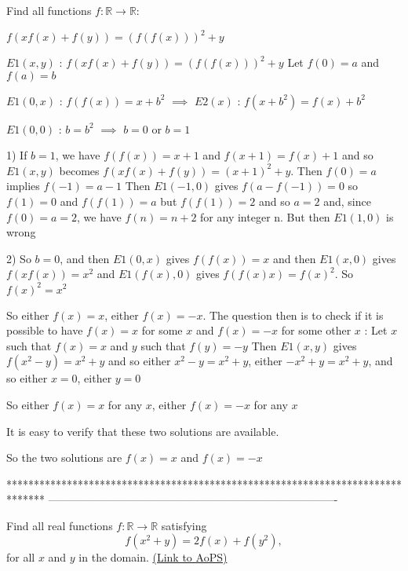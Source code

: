 \begin{mysolution}
	\begin{tcolorbox}Find all functions $f: \mathbb{R}\rightarrow\mathbb{R}$:

$f\left(xf(x)+f(y)\right)=\left(f(f(x))\right)^{2}+y$\end{tcolorbox}

$E1(x,y)$ : $f\left(xf(x)+f(y)\right)=\left(f(f(x))\right)^{2}+y$
Let $f(0)=a$ and $f(a)=b$

$E1(0,x)$ : $f(f(x))=x+b^{2}$ $\implies$ $E2(x)$ : $f(x+b^{2})=f(x)+b^{2}$

$E1(0,0)$ : $b=b^{2}$ $\implies$ $b=0$ or $b=1$

1) If $b=1$, we have $f(f(x))=x+1$ and $f(x+1)=f(x)+1$ and so $E1(x,y)$ becomes $f(xf(x)+f(y))=(x+1)^{2}+y$. 
Then $f(0)=a$ implies $f(-1)=a-1$
Then $E1(-1,0)$ gives $f(a-f(-1))=0$ so $f(1)=0$ and $f(f(1))=a$ but $f(f(1))=2$ and so $a=2$ and, since $f(0)=a=2$, we have $f(n)=n+2$ for any integer n.
But then $E1(1,0)$ is wrong

2) So $b=0$, and then  $E1(0,x)$ gives $f(f(x))=x$ and then $E1(x,0)$ gives $f(xf(x))=x^{2}$ and $E1(f(x),0)$ gives $f(f(x)x)=f(x)^{2}$. So $f(x)^{2}=x^{2}$

So either $f(x)=x$, either $f(x)=-x$. The question then is to check if it is possible to have $f(x)=x$ for some $x$ and $f(x)=-x$ for some other $x$ :
Let $x$ such that $f(x)=x$ and $y$ such that $f(y)=-y$
Then $E1(x,y)$ gives $f(x^{2}-y)=x^{2}+y$ and so either $x^{2}-y=x^{2}+y$, either $-x^{2}+y=x^{2}+y$, and so either $x=0$, either $y=0$

So either $f(x)=x$ for any $x$, either $f(x)=-x$ for any $x$

It is easy to verify that these two solutions are available.

So the two solutions are $f(x)=x$ and $f(x)=-x$
\end{mysolution}
*******************************************************************************
-------------------------------------------------------------------------------

\begin{problem}
	Find all real functions $f: \mathbb R\to \mathbb R$ satisfying
\[f\left(x^{2}+y\right)=2f(x)+f(y^{2}),\]
for all $x$ and $y$ in the domain.
	\flushright \href{https://artofproblemsolving.com/community/c6h154364}{(Link to AoPS)}
\end{problem}



